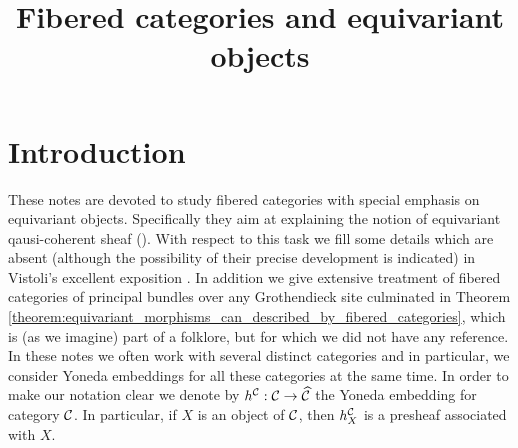 



\title{Fibered categories and equivariant objects}
\date{}
\maketitle

\section{Introduction}
\noindent
These notes are devoted to study fibered categories with special emphasis on equivariant objects. Specifically they aim at explaining the notion of equivariant qausi-coherent sheaf ({\cite[definition 1.6]{mumford1994geometric}}). With respect to this task we fill some details which are absent (although the possibility of their precise development is indicated) in Vistoli's excellent exposition {\cite[Part 1]{fantechi2005fundamental}}. In addition we give extensive treatment of fibered categories of principal bundles over any Grothendieck site culminated in Theorem \ref{theorem:equivariant_morphisms_can_described_by_fibered_categories}, which is (as we imagine) part of a folklore, but for which we did not have any reference.\\ 
In these notes we often work with several distinct categories and in particular, we consider Yoneda embeddings for all these categories at the same time. In order to make our notation clear we denote by $h^{{\mathcal C}}:{\mathcal C}\rightarrow \widehat{{\mathcal C}}$ the Yoneda embedding for category ${\mathcal C}$. In particular, if $X$ is an object of ${\mathcal C}$, then $h^{{\mathcal C}}_X$ is a presheaf associated with $X$.

